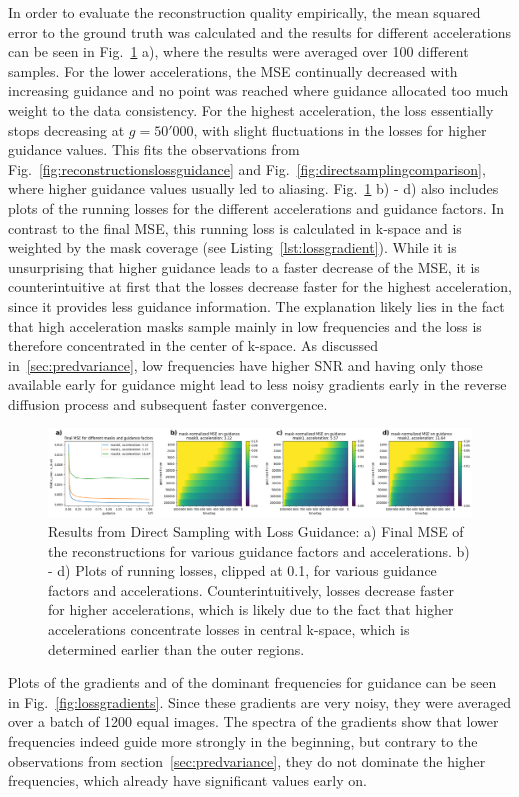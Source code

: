 In order to evaluate the reconstruction quality empirically, the mean squared error to the ground truth was calculated and the results for different accelerations can be seen in Fig.~\ref{fig:lossguidancelosses} a), where the results were averaged over 100 different samples. For the lower accelerations, the MSE continually decreased with increasing guidance and no point was reached where guidance allocated too much weight to the data consistency. For the highest acceleration, the loss essentially stops decreasing at $g=50'000$, with slight fluctuations in the losses for higher guidance values. This fits the observations from Fig.~\ref{fig:reconstructionslossguidance} and Fig.~\ref{fig:directsamplingcomparison}, where higher guidance values usually led to aliasing. Fig.~\ref{fig:lossguidancelosses} b) - d) also includes plots of the running losses for the different accelerations and guidance factors. In contrast to the final MSE, this running loss is calculated in k-space and is weighted by the mask coverage (see Listing~\ref{lst:lossgradient}). While it is unsurprising that higher guidance leads to a faster decrease of the MSE, it is counterintuitive at first that the losses decrease faster for the highest acceleration, since it provides less guidance information. The explanation likely lies in the fact that high acceleration masks sample mainly in low frequencies and the loss is therefore concentrated in the center of k-space. As discussed in~\ref{sec:predvariance}, low frequencies have higher SNR and having only those available early for guidance might lead to less noisy gradients early in the reverse diffusion process and subsequent faster convergence.
\begin{figure}[h]
    \centering
    \includegraphics[width=\textwidth]{images/direct_sampling.png}
    \caption[Direct Sampling with Loss Guidance]{Results from Direct Sampling with Loss Guidance: a) Final MSE of the reconstructions for various guidance factors and accelerations. b) - d) Plots of running losses, clipped at 0.1, for various guidance factors and accelerations. Counterintuitively, losses decrease faster for higher accelerations, which is likely due to the fact that higher accelerations concentrate losses in central k-space, which is determined earlier than the outer regions.}
    \label{fig:lossguidancelosses}
\end{figure}
Plots of the gradients and of the dominant frequencies for guidance can be seen in Fig.~\ref{fig:lossgradients}. Since these gradients are very noisy, they were averaged over a batch of 1200 equal images. The spectra of the gradients show that lower frequencies indeed guide more strongly in the beginning, but contrary to the observations from section~\ref{sec:predvariance}, they do not dominate the higher frequencies, which already have significant values early on.

